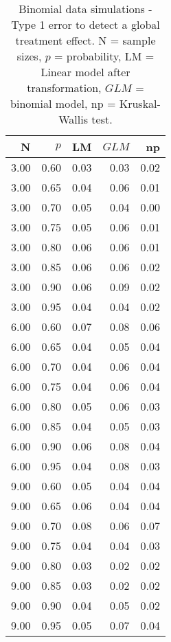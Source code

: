 \begin{table}[H]
\centering
\caption{Binomial data simulations - Type 1 error to detect a global treatment effect. N = sample sizes, 
             $p$ = probability, LM = Linear model after transformation, 
             $GLM$ = binomial model, np = Kruskal-Wallis test.} 
\label{tab:t1_glob_p}
{\footnotesize
\begin{tabular}{rrrrr}
  \hline
N & $p$ & LM & $GLM$ & np \\ 
  \hline
3.00 & 0.60 & 0.03 & 0.03 & 0.02 \\ 
  3.00 & 0.65 & 0.04 & 0.06 & 0.01 \\ 
  3.00 & 0.70 & 0.05 & 0.04 & 0.00 \\ 
  3.00 & 0.75 & 0.05 & 0.06 & 0.01 \\ 
  3.00 & 0.80 & 0.06 & 0.06 & 0.01 \\ 
  3.00 & 0.85 & 0.06 & 0.06 & 0.02 \\ 
  3.00 & 0.90 & 0.06 & 0.09 & 0.02 \\ 
  3.00 & 0.95 & 0.04 & 0.04 & 0.02 \\ 
  6.00 & 0.60 & 0.07 & 0.08 & 0.06 \\ 
  6.00 & 0.65 & 0.04 & 0.05 & 0.04 \\ 
  6.00 & 0.70 & 0.04 & 0.06 & 0.04 \\ 
  6.00 & 0.75 & 0.04 & 0.06 & 0.04 \\ 
  6.00 & 0.80 & 0.05 & 0.06 & 0.03 \\ 
  6.00 & 0.85 & 0.04 & 0.05 & 0.03 \\ 
  6.00 & 0.90 & 0.06 & 0.08 & 0.04 \\ 
  6.00 & 0.95 & 0.04 & 0.08 & 0.03 \\ 
  9.00 & 0.60 & 0.05 & 0.04 & 0.04 \\ 
  9.00 & 0.65 & 0.06 & 0.04 & 0.04 \\ 
  9.00 & 0.70 & 0.08 & 0.06 & 0.07 \\ 
  9.00 & 0.75 & 0.04 & 0.04 & 0.03 \\ 
  9.00 & 0.80 & 0.03 & 0.02 & 0.02 \\ 
  9.00 & 0.85 & 0.03 & 0.02 & 0.02 \\ 
  9.00 & 0.90 & 0.04 & 0.05 & 0.02 \\ 
  9.00 & 0.95 & 0.05 & 0.07 & 0.04 \\ 
   \hline
\end{tabular}
}
\end{table}
